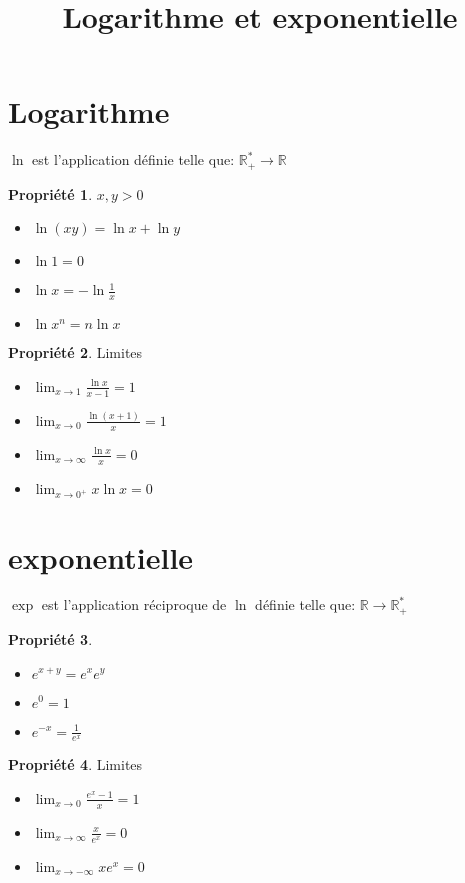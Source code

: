 \documentclass[fleqn]{article}
\title{Logarithme et exponentielle}
\date{}
\theoremstyle{definition} \newtheorem*{defi}{D\'efinition}
\theoremstyle{definition} \newtheorem*{theo}{Th\'eor\`eme}
\theoremstyle{definition} \newtheorem*{prop}{Propri\'et\'e}
\begin{document}
\maketitle

\section{Logarithme}
$\ln$ est l'application d\'efinie telle que: $\mathbb{R}^*_+ \rightarrow \mathbb{R}$
\begin{prop} $x,y > 0$
	\begin{itemize}
		\item $\ln (xy) = \ln x + \ln y$
		\item $\ln 1 = 0$
		\item $\ln x = -\ln \frac{1}{x}$
		\item $\ln x^n = n\ln x$
	\end{itemize}
\end{prop}
\begin{prop} Limites
	\begin{itemize}
		\item $\lim_{x\to 1} \frac{\ln x}{x-1} = 1$
		\item $\lim_{x\to 0} \frac{\ln (x+1)}{x} = 1$
		\item $\lim_{x\to\infty} \frac{\ln x}{x} = 0$
		\item $\lim_{x\to 0^+} x\ln x = 0$
	\end{itemize}
\end{prop}

\section{exponentielle}
$\exp$ est l'application r\'eciproque de $\ln$ d\'efinie telle que: $\mathbb{R} \rightarrow \mathbb{R}^*_+$
\begin{prop} $ $
	\begin{itemize}
		\item $e^{x+y} = e^xe^y$
		\item $e^0 = 1$
		\item $e^{-x} = \frac{1}{e^x}$
	\end{itemize}
\end{prop}
\begin{prop} Limites
	\begin{itemize}
		\item $\lim_{x\to 0} \frac{e^x-1}{x} = 1$
		\item $\lim_{x\to\infty} \frac{x}{e^x} = 0$
		\item $\lim_{x\to-\infty} xe^x = 0$
	\end{itemize}
\end{prop}
\end{document}
